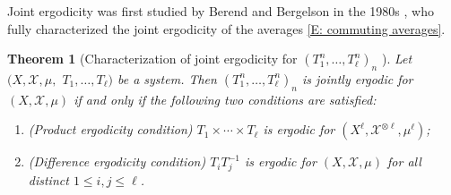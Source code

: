 \documentclass[11pt]{amsart}
\newtheorem{theorem}[lemma]{Theorem}
\theoremstyle{definition}
\newcommand{\CX}{{\mathcal X}}
\newcommand{\inv}{^{-1}}
\newcommand{\1}{{\mathbf{1}}}
\begin{document}
Joint ergodicity was first studied by Berend and Bergelson in the 1980s \cite{BB84, BB86}, who fully characterized the joint ergodicity of the averages \eqref{E: commuting averages}.
\begin{theorem}[Characterization of joint ergodicity for $(T_1^n, \ldots, T_\ell^n)_n$ {\cite[Theorem 3.1]{BB84}}]\label{T: BB characterization}
    Let $(X, \CX, \mu,$\! $T_1, \ldots, T_\ell)$ be a system. Then $(T_1^n, \ldots, T_\ell^n)_n$ is jointly ergodic for $(X, \CX, \mu)$ if and only if the following two conditions are satisfied:
    \begin{enumerate}
        \item (Product ergodicity condition) $T_1\times \cdots \times T_\ell$ is ergodic for $(X^\ell, \CX^{\otimes \ell}, \mu^\ell)$;
        \item (Difference ergodicity condition) $T_iT_j\inv$ is ergodic for $(X, \CX, \mu)$ for all distinct $1\leq i, j \leq \ell$. 
    \end{enumerate}
\end{theorem}
\end{document}

